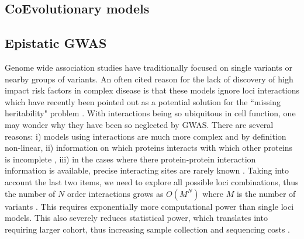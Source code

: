 


\subsection{CoEvolutionary models}


\subsection{Epistatic GWAS \label{sec:epigwas}}

Genome wide association studies have traditionally focused on single variants or nearby groups of variants. An often cited reason for the lack of discovery of high impact risk factors in complex disease is that these models ignore loci interactions \cite{cordell2009detecting} which have recently been pointed out as a potential solution for the ``missing heritability" problem \cite{zuk2012mystery, zuk2014searching}. With interactions being so ubiquitous in cell function, one may wonder why they have been so neglected by GWAS. There are several reasons: i) models using interactions are much more complex \cite{gao2010classification} and by definition non-linear, ii) information on which proteins interacts with which other proteins is incomplete \cite{venkatesan2009empirical}, iii) in the cases where there protein-protein interaction information is available, precise interacting sites are rarely known \cite{venkatesan2009empirical}. Taking into account the last two items, we need to explore all possible loci combinations, thus the number of $N$ order interactions grows as $O(M^N)$ where $M$ is the number of variants \cite{de2013emerging}. This requires exponentially more computational power than single loci models. This also severely reduces statistical power, which translates into requiring larger cohort, thus increasing sample collection and sequencing costs \cite{de2013emerging}.

